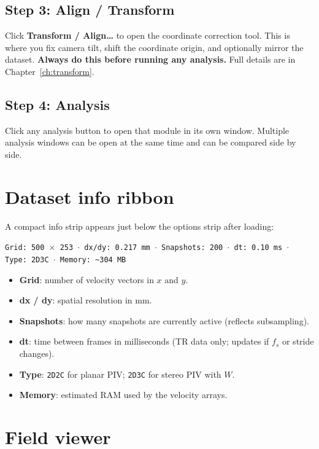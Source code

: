 \documentclass[11pt, a4paper]{report}
\newcommand{\uipth}[1]{\textbf{\textcolor{upblue}{#1}}}
\begin{document}
\subsection{Step 3: Align / Transform}

Click \uipth{Transform / Align\ldots} to open the coordinate correction tool. This is where you fix camera tilt, shift the coordinate origin, and optionally mirror the dataset. \textbf{Always do this before running any analysis.} Full details are in Chapter~\ref{ch:transform}.

\subsection{Step 4: Analysis}

Click any analysis button to open that module in its own window. Multiple analysis windows can be open at the same time and can be compared side by side.

\section{Dataset info ribbon}
\label{sec:datasetinfo}

A compact info strip appears just below the options strip after loading:

\begin{center}
\texttt{Grid: 500\,$\times$\,253 $\cdot$ dx/dy: 0.217\,mm $\cdot$ Snapshots: 200 $\cdot$ dt: 0.10\,ms $\cdot$ Type: 2D3C $\cdot$ Memory: \textasciitilde{}304\,MB}
\end{center}

\begin{itemize}[leftmargin=1.5em]
  \item \textbf{Grid}: number of velocity vectors in $x$ and $y$.
  \item \textbf{dx / dy}: spatial resolution in mm.
  \item \textbf{Snapshots}: how many snapshots are currently active (reflects subsampling).
  \item \textbf{dt}: time between frames in milliseconds (TR data only; updates if $f_s$ or stride changes).
  \item \textbf{Type}: \texttt{2D2C} for planar PIV; \texttt{2D3C} for stereo PIV with $W$.
  \item \textbf{Memory}: estimated RAM used by the velocity arrays.
\end{itemize}

\section{Field viewer}
\end{document}
